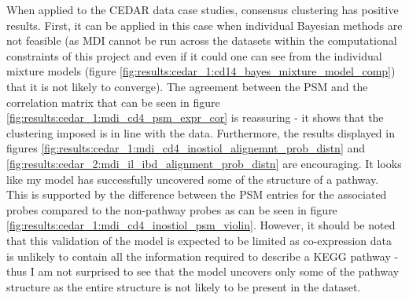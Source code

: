 \documentclass[12pt]{article} %
\begin{document}
	
	When applied to the CEDAR data case studies, consensus clustering has positive results. First, it can be applied in this case when individual Bayesian methods are not feasible (as MDI cannot be run across the datasets within the computational constraints of this project and even if it could one can see from the individual mixture models (figure  \ref{fig:results:cedar_1:cd14_bayes_mixture_model_comp}) that it is not likely to converge). The agreement between the PSM and the correlation matrix that can be seen in figure \ref{fig:results:cedar_1:mdi_cd4_psm_expr_cor} is reassuring - it shows that the clustering imposed is in line with the data. Furthermore, the results displayed in figures \ref{fig:results:cedar_1:mdi_cd4_inostiol_alignemnt_prob_distn} and \ref{fig:results:cedar_2:mdi_il_ibd_alignment_prob_distn} are encouraging. It looks like my model has successfully uncovered some of the structure of a pathway. This is supported by the difference between the PSM entries for the associated probes compared to the non-pathway probes as can be seen in figure \ref{fig:results:cedar_1:mdi_cd4_inostiol_psm_violin}. However, it should be noted that this validation of the model is expected to be limited as co-expression data is unlikely to contain all the information required to describe a KEGG pathway - thus I am not surprised to see that the model uncovers only some of the pathway structure as the entire structure is not likely to be present in the dataset.
	
\end{document}
